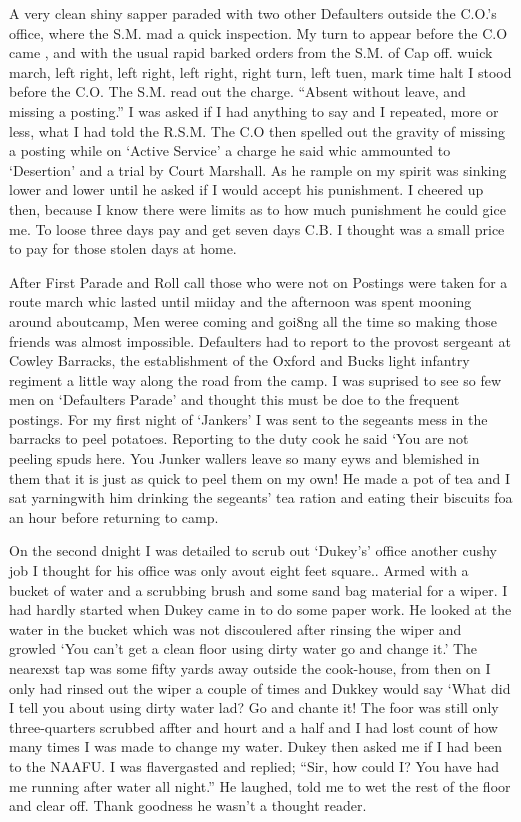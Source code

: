 A very clean shiny sapper paraded with two other Defaulters outside
the C.O.'s office, where the S.M. mad a quick inspection. My turn to
appear before the C.O came , and with the usual rapid barked orders
from the S.M. of Cap off. wuick march, left right, left right, left
right, right turn, left tuen, mark time halt I stood before the
C.O. The S.M. read out the charge. ``Absent without leave, and missing
a posting.'' I was asked if I had anything to say and I repeated, more
or less, what I had told the R.S.M. The C.O then spelled out the
gravity of missing a posting while on `Active Service' a charge he
said whic ammounted to `Desertion' and a trial by Court Marshall. As
he rample on my spirit was sinking lower and lower until he asked if I
would accept his punishment. I cheered up then, because I know there
were limits as to how much punishment he could gice me. To loose three
days pay and get seven days C.B. I thought was a small price to pay
for those stolen days at home.

After First Parade and Roll call those who were not on Postings were
taken for a route march whic lasted until miiday and the afternoon was
spent mooning around aboutcamp, Men weree coming and goi8ng all the
time so making those friends was almost impossible. Defaulters had to
report to the provost sergeant at Cowley Barracks, the establishment of
the Oxford and Bucks light infantry regiment a little way along the
road from the camp. I was suprised to see so few men on `Defaulters
Parade' and thought this must be doe to the frequent postings. For my
first night of `Jankers' I was sent to the segeants mess in the
barracks to peel potatoes. Reporting to the duty cook he said `You are
not peeling spuds here. You Junker wallers leave so many eyws and
blemished in them that it is just as quick to peel them on my own! He
made a pot of tea and I sat yarningwith him drinking the segeants' tea
ration and eating their biscuits foa an hour before returning to camp.

On the second dnight I was detailed to scrub out `Dukey's' office
another cushy job I thought for his office was only avout eight feet
square.. Armed with a bucket of water and a scrubbing brush and some
sand bag material for a wiper. I had hardly started when Dukey came in
to do some paper work. He looked at the water in the bucket which was
not discoulered after rinsing the wiper and growled `You can't get a
clean floor using dirty water go and change it.' The nearexst tap was
some fifty yards away outside the cook-house, from then on I only had
rinsed out the wiper a couple of times and Dukkey would say `What did
I tell you about using dirty water lad? Go and chante it! The foor was
still only three-quarters scrubbed affter and hourt and a half and I
had lost count of how many times I was made to change my water. Dukey
then asked me if I had been to the NAAFU. I was flavergasted and
replied; ``Sir, how could I? You have had me running after water all
night.'' He laughed, told me to wet the rest of the floor and clear
off. Thank goodness he wasn't a thought reader.

